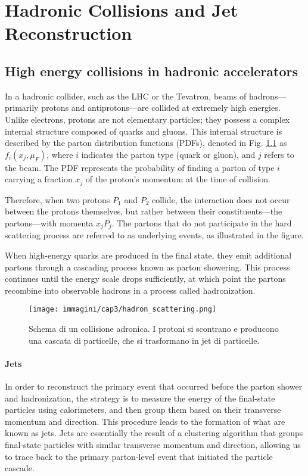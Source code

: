 \chapter{Hadronic Collisions and Jet Reconstruction}

\section{High energy collisions in hadronic accelerators}

In a hadronic collider, such as the LHC or the Tevatron, beams of hadrons—primarily protons and antiprotons—are collided at extremely high energies.
Unlike electrons, protons are not elementary particles; they possess a complex internal structure composed of quarks and gluons. This internal structure is described by the parton distribution functions (PDFs), denoted in Fig. \ref{fig:hadronic_collisions} as $f_i(x_j, \mu_F)$, where $i$ indicates the parton type (quark or gluon), and $j$ refers to the beam. The PDF represents the probability of finding a parton of type $i$ carrying a fraction $x_j$ of the proton’s momentum at the time of collision.

Therefore, when two protons $P_1$ and $P_2$ collide, the interaction does not occur between the protons themselves, but rather between their constituents—the partons—with momenta $x_jP_j$. The partons that do not participate in the hard scattering process are referred to as underlying events, as illustrated in the figure.

When high-energy quarks are produced in the final state, they emit additional partons through a cascading process known as parton showering. This process continues until the energy scale drops sufficiently, at which point the partons recombine into observable hadrons in a process called hadronization.
\begin{figure}[!htbp]
    \centering
    \texttt{[image: immagini/cap3/hadron\_scattering.png]}
    \caption{Schema di un collisione adronica. I protoni si scontrano e producono una cascata di particelle, che si trasformano in jet di particelle.} 
    \label{fig:hadronic_collisions}
\end{figure}

\subsubsection{Jets}
In order to reconstruct the primary event that occurred before the parton shower and hadronization, the strategy is to measure the energy of the final-state particles using calorimeters, and then group them based on their transverse momentum and direction. This procedure leads to the formation of what are known as jets.
Jets are essentially the result of a clustering algorithm that groups final-state particles with similar transverse momentum and direction, allowing us to trace back to the primary parton-level event that initiated the particle cascade.


